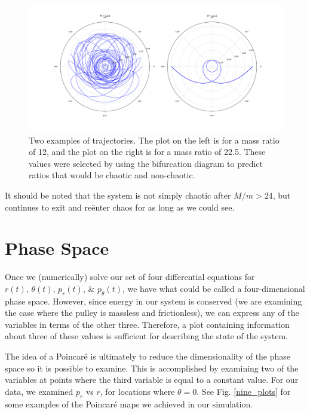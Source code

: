 \documentclass{article}
\begin{document}
\begin{figure}
\centering
\includegraphics[width=\textwidth]{two_spots}
\caption{Two examples of trajectories.  The plot on the left is for a mass ratio of 12, and the plot on the right is for a mass ratio of 22.5.  These values were selected by using the bifurcation diagram to predict ratios that would be chaotic and non-chaotic.}
\label{bifurcation}
\end{figure}

It should be noted that the system is not simply chaotic after $M/m > 24$, but continues to exit and re\"enter chaos for as long as we could see.

\section*{Phase Space}

Once we (numerically) solve our set of four differential equations for $r(t),\, \theta(t),\, p_{r}(t),\,\& \,\, p_{\theta}(t)$, we have what could be called a four-dimensional phase space.  However, since energy in our system is conserved (we are examining the case where the pulley is massless and frictionless), we can express any of the variables in terms of the other three.  Therefore, a plot containing information about three of these values is sufficient for describing the state of the system.

The idea of a Poincar\'e is ultimately to reduce the dimensionality of the phase space so it is possible to examine.  This is accomplished by examining two of the variables at points where the third variable is equal to a constant value.  For our data, we examined $p_r$ vs $r$, for locations where $\theta = 0$.  See Fig. \ref{nine_plots} for some examples of the Poincar\'e maps we achieved in our simulation.  
\end{document}
